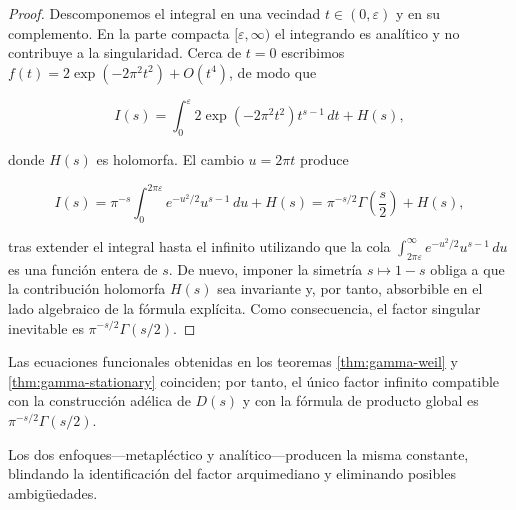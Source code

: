 \begin{proof}
Descomponemos el integral en una vecindad $t\in(0,\varepsilon)$ y en su complemento.
En la parte compacta $[\varepsilon,\infty)$ el integrando es analítico y no
contribuye a la singularidad.  Cerca de $t=0$ escribimos
$f(t)=2\exp(-2\pi^2 t^2)+O(t^4)$, de modo que

\[
 I(s)=\int_0^\varepsilon 2\exp(-2\pi^2 t^2)t^{s-1}\,dt + H(s),
\]

donde $H(s)$ es holomorfa.  El cambio $u=2\pi t$ produce

\[
 I(s)=\pi^{-s}\int_0^{2\pi \varepsilon} e^{-u^2/2} u^{s-1}\,du + H(s)
 =\pi^{-s/2}\Gamma\!\left(\frac{s}{2}\right)+H(s),
\]

tras extender el integral hasta el infinito utilizando que la cola
$\int_{2\pi \varepsilon}^\infty e^{-u^2/2}u^{s-1}\,du$ es una función entera de
$s$.  De nuevo, imponer la simetría $s\mapsto1-s$ obliga a que la contribución
holomorfa $H(s)$ sea invariante y, por tanto, absorbible en el lado algebraico de
la fórmula explícita.  Como consecuencia, el factor singular inevitable es
$\pi^{-s/2}\Gamma(s/2)$.
\end{proof}

\begin{corollary}
Las ecuaciones funcionales obtenidas en los teoremas
\ref{thm:gamma-weil} y \ref{thm:gamma-stationary} coinciden; por tanto, el único
factor infinito compatible con la construcción adélica de $D(s)$ y con la fórmula
de producto global es $\pi^{-s/2}\Gamma(s/2)$.
\end{corollary}

Los dos enfoques---metapléctico y analítico---producen la misma constante,
blindando la identificación del factor arquimediano y eliminando posibles ambigüedades.
